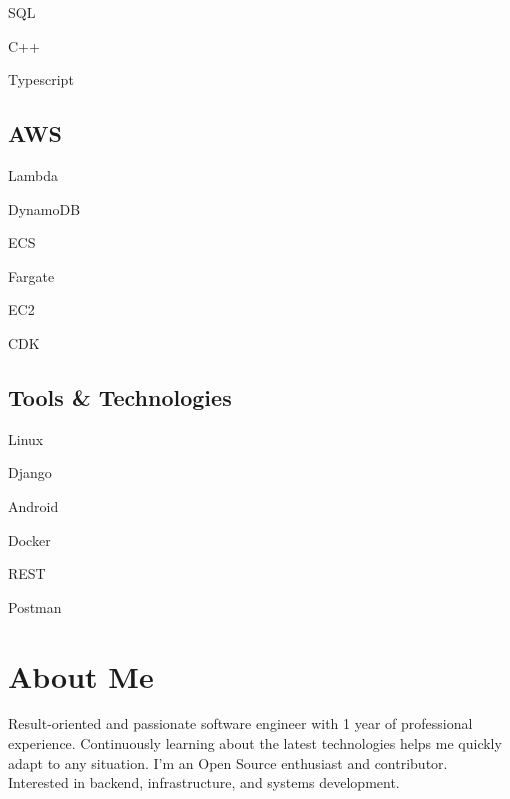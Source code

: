 \documentclass[]{resume}
\begin{document}
\begin{minipage}[t]{0.25\textwidth}
\begin{itemize*}
 \item SQL
 \item C++
 \item Typescript
\end{itemize*}
\subsectionsep

\subsection{AWS}
\begin{itemize*}
 \item Lambda
 \item DynamoDB
 \item ECS
 \item Fargate
 \item EC2
 \item CDK
\end{itemize*}
\subsectionsep

\subsection{Tools \& Technologies}
\begin{itemize*}
 \item Linux
 \item Django
 \item Android
 \item Docker
 \item REST
 \item Postman
\end{itemize*}
\secondarysectionsep

\section{About Me}
\noindent \RaggedRight \normalfont
Result-oriented and passionate software engineer with 1 year of professional experience.
Continuously learning about the latest technologies helps me quickly adapt to any situation.
I'm an Open Source enthusiast and contributor. Interested in backend, infrastructure, and
systems development.

%
%

\end{minipage}
\hfill
\end{document}
